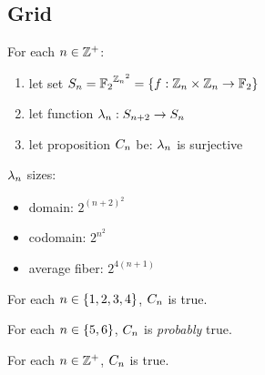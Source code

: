 \documentclass[letterpaper, 14pt]{extarticle}
\begin{document}
\begin{flushleft}

\subsection{Grid}

\begin{definition}
For each $n \in \mathbb{Z}^+$:
\begin{enumerate}
\item let set $S_{n} = {\mathbb{F}_2}^{{\mathbb{Z}_n}^2} =
  \{f: \mathbb{Z}_n \times \mathbb{Z}_n \to \mathbb{F}_2\}$
\item let function $\lambda_{n}: S_{n+2} \to S_{n}$
\item let proposition $C_{n}$ be: $\lambda_{n}$ is surjective
\end{enumerate}
\end{definition}

\begin{remark}
$\lambda_{n}$ sizes:
\begin{itemize}
\item domain: $2^{(n+2)^2}$
\item codomain: $2^{n^2}$
\item average fiber: $2^{4(n+1)}$
\end{itemize}
\end{remark}

\begin{remark}
For each $n \in \{1, 2, 3, 4\}$, $C_{n}$ is true.
\end{remark}

\begin{remark}
For each $n \in \{5, 6\}$, $C_{n}$ is
\emph{probably} true.
\end{remark}

\begin{conjecture}
For each $n \in \mathbb{Z}^+$, $C_{n}$ is true.
\end{conjecture}


\end{flushleft}
\end{document}
